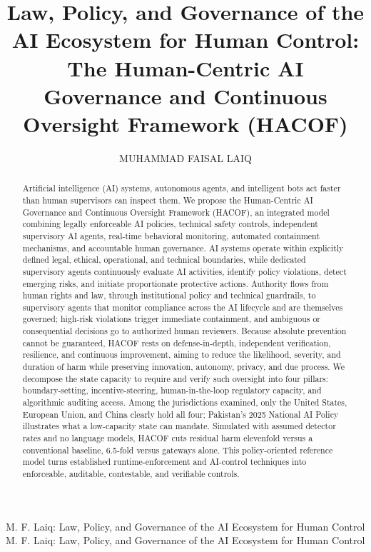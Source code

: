 \documentclass{ieeeaccess}
\begin{document}

\title{Law, Policy, and Governance of the AI Ecosystem for Human Control: The Human-Centric AI Governance and Continuous Oversight Framework (HACOF)}
\author{\uppercase{Muhammad Faisal Laiq}}

\address[1]{(e-mail: shmlaiq@gmail.com; ORCID: 0009-0007-5779-9836)}

\markboth
{M. F. Laiq: Law, Policy, and Governance of the AI Ecosystem for Human Control}
{M. F. Laiq: Law, Policy, and Governance of the AI Ecosystem for Human Control}


\begin{abstract}
Artificial intelligence (AI) systems, autonomous agents, and intelligent bots act faster than human supervisors can inspect them. We propose the Human-Centric AI Governance and Continuous Oversight Framework (HACOF), an integrated model combining legally enforceable AI policies, technical safety controls, independent supervisory AI agents, real-time behavioral monitoring, automated containment mechanisms, and accountable human governance. AI systems operate within explicitly defined legal, ethical, operational, and technical boundaries, while dedicated supervisory agents continuously evaluate AI activities, identify policy violations, detect emerging risks, and initiate proportionate protective actions. Authority flows from human rights and law, through institutional policy and technical guardrails, to supervisory agents that monitor compliance across the AI lifecycle and are themselves governed; high-risk violations trigger immediate containment, and ambiguous or consequential decisions go to authorized human reviewers. Because absolute prevention cannot be guaranteed, HACOF rests on defense-in-depth, independent verification, resilience, and continuous improvement, aiming to reduce the likelihood, severity, and duration of harm while preserving innovation, autonomy, privacy, and due process. We decompose the state capacity to require and verify such oversight into four pillars: boundary-setting, incentive-steering, human-in-the-loop regulatory capacity, and algorithmic auditing access. Among the jurisdictions examined, only the United States, European Union, and China clearly hold all four; Pakistan's 2025 National AI Policy illustrates what a low-capacity state can mandate. Simulated with assumed detector rates and no language models, HACOF cuts residual harm elevenfold versus a conventional baseline, 6.5-fold versus gateways alone. This policy-oriented reference model turns established runtime-enforcement and AI-control techniques into enforceable, auditable, contestable, and verifiable controls.
\end{abstract}
\end{document}
